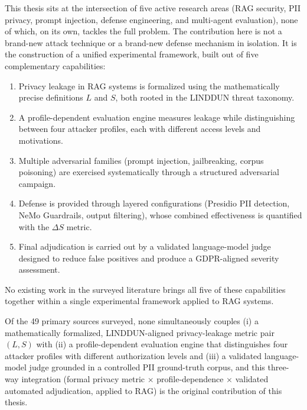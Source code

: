 \begin{notebox}
This thesis sits at the intersection of five active research areas (RAG security, PII privacy, prompt injection, defense engineering, and multi-agent evaluation), none of which, on its own, tackles the full problem. The contribution here is not a brand-new attack technique or a brand-new defense mechanism in isolation. It is the construction of a unified experimental framework, built out of five complementary capabilities:

\begin{enumerate}[leftmargin=1.5em, itemsep=3pt]
  \item Privacy leakage in RAG systems is formalized using the mathematically precise definitions $L$ and $S$, both rooted in the LINDDUN threat taxonomy.
  \item A profile-dependent evaluation engine measures leakage while distinguishing between four attacker profiles, each with different access levels and motivations.
  \item Multiple adversarial families (prompt injection, jailbreaking, corpus poisoning) are exercised systematically through a structured adversarial campaign.
  \item Defense is provided through layered configurations (Presidio PII detection, NeMo Guardrails, output filtering), whose combined effectiveness is quantified with the $\Delta S$ metric.
  \item Final adjudication is carried out by a validated language-model judge designed to reduce false positives and produce a GDPR-aligned severity assessment.
\end{enumerate}

No existing work in the surveyed literature brings all five of these capabilities together within a single experimental framework applied to RAG systems.
\end{notebox}

\begin{transitionbox}
Of the 49 primary sources surveyed, none simultaneously couples (i) a mathematically formalized, LINDDUN-aligned privacy-leakage metric pair $(L, S)$ with (ii) a profile-dependent evaluation engine that distinguishes four attacker profiles with different authorization levels and (iii) a validated language-model judge grounded in a controlled PII ground-truth corpus, and this three-way integration (formal privacy metric $\times$ profile-dependence $\times$ validated automated adjudication, applied to RAG) is the original contribution of this thesis.
\end{transitionbox}

